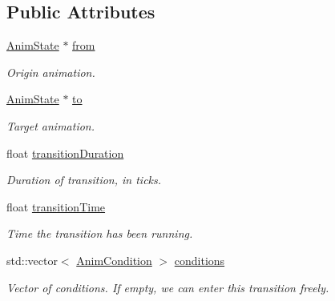 \subsection*{Public Attributes}
\begin{DoxyCompactItemize}
\item 
\mbox{\label{structAnimTransition_a3a3a68577c477a031437d5f246141db7}} 
\hyperlink{structAnimState}{Anim\+State} $\ast$ \hyperlink{structAnimTransition_a3a3a68577c477a031437d5f246141db7}{from}
\begin{DoxyCompactList}\small\item\em Origin animation. \end{DoxyCompactList}\item 
\mbox{\label{structAnimTransition_a73bd8f29355ac7b233647d296d9a061e}} 
\hyperlink{structAnimState}{Anim\+State} $\ast$ \hyperlink{structAnimTransition_a73bd8f29355ac7b233647d296d9a061e}{to}
\begin{DoxyCompactList}\small\item\em Target animation. \end{DoxyCompactList}\item 
\mbox{\label{structAnimTransition_acd901f21fdabd3da04664b909b50b7de}} 
float \hyperlink{structAnimTransition_acd901f21fdabd3da04664b909b50b7de}{transition\+Duration}
\begin{DoxyCompactList}\small\item\em Duration of transition, in ticks. \end{DoxyCompactList}\item 
\mbox{\label{structAnimTransition_aee7a43acbecd5bb1220a1c478af2732d}} 
float \hyperlink{structAnimTransition_aee7a43acbecd5bb1220a1c478af2732d}{transition\+Time}
\begin{DoxyCompactList}\small\item\em Time the transition has been running. \end{DoxyCompactList}\item 
\mbox{\label{structAnimTransition_af3fa828e2da65031824d064e33d1c522}} 
std\+::vector$<$ \hyperlink{structAnimCondition}{Anim\+Condition} $>$ \hyperlink{structAnimTransition_af3fa828e2da65031824d064e33d1c522}{conditions}
\begin{DoxyCompactList}\small\item\em Vector of conditions. If empty, we can enter this transition freely. \end{DoxyCompactList}\end{DoxyCompactItemize}


